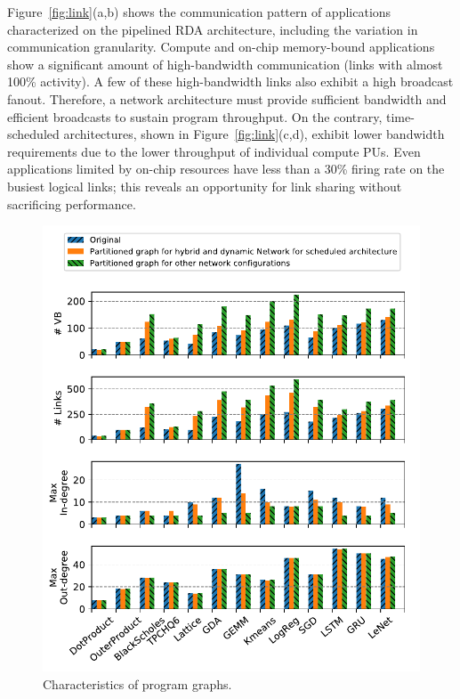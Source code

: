 Figure~\ref{fig:link}(a,b) shows the communication pattern of applications
characterized on the pipelined RDA architecture, including the variation in communication granularity. 
Compute and on-chip memory-bound applications show a significant amount of high-bandwidth communication (links with almost 100\% activity). 
A few of these high-bandwidth links also exhibit a high broadcast fanout. 
Therefore, a network architecture must provide sufficient bandwidth and efficient broadcasts to sustain program throughput.
On the contrary, time-scheduled architectures, shown in Figure~\ref{fig:link}(c,d), exhibit
lower bandwidth requirements due to the lower throughput of individual compute PUs. 
Even applications limited by on-chip resources have less than a 30\% firing rate on the busiest logical links; this reveals an opportunity for link sharing without sacrificing performance.

\begin{figure}
\centering
\includegraphics[width=0.9\columnwidth]{network/figs/graph.pdf}
\caption{Characteristics of program graphs.}\label{fig:graph}
\end{figure}

